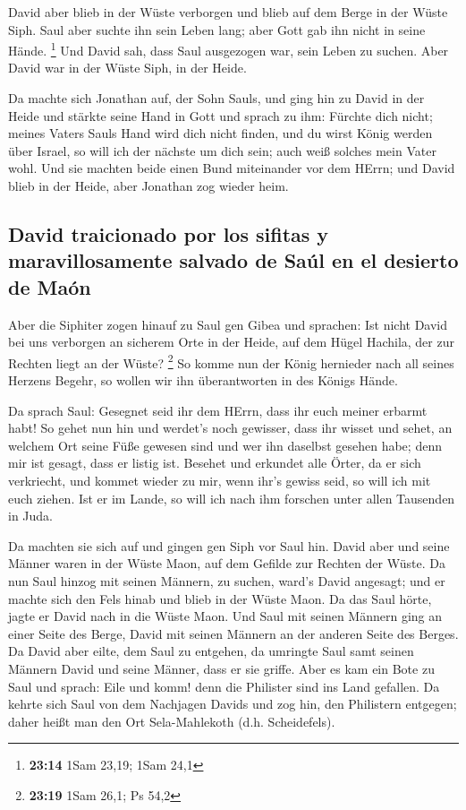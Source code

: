  David aber blieb in der Wüste verborgen und blieb auf
dem Berge in der Wüste Siph. Saul aber suchte ihn sein Leben lang; aber
Gott gab ihn nicht in seine Hände. \footnote{\textbf{23:14} 1Sam 23,19;
  1Sam 24,1}  Und David sah, dass Saul ausgezogen war,
sein Leben zu suchen. Aber David war in der Wüste Siph, in der Heide.

 Da machte sich Jonathan auf, der Sohn Sauls, und ging
hin zu David in der Heide und stärkte seine Hand in Gott 
und sprach zu ihm: Fürchte dich nicht; meines Vaters Sauls Hand wird
dich nicht finden, und du wirst König werden über Israel, so will ich
der nächste um dich sein; auch weiß solches mein Vater wohl.
 Und sie machten beide einen Bund miteinander vor dem
HErrn; und David blieb in der Heide, aber Jonathan zog wieder heim.

\hypertarget{david-traicionado-por-los-sifitas-y-maravillosamente-salvado-de-sauxfal-en-el-desierto-de-mauxf3n}{%
\subsection{David traicionado por los sifitas y maravillosamente salvado
de Saúl en el desierto de
Maón}\label{david-traicionado-por-los-sifitas-y-maravillosamente-salvado-de-sauxfal-en-el-desierto-de-mauxf3n}}

 Aber die Siphiter zogen hinauf zu Saul gen Gibea und
sprachen: Ist nicht David bei uns verborgen an sicherem Orte in der
Heide, auf dem Hügel Hachila, der zur Rechten liegt an der Wüste?
\footnote{\textbf{23:19} 1Sam 26,1; Ps 54,2}  So komme
nun der König hernieder nach all seines Herzens Begehr, so wollen wir
ihn überantworten in des Königs Hände.

 Da sprach Saul: Gesegnet seid ihr dem HErrn, dass ihr
euch meiner erbarmt habt!  So gehet nun hin und werdet's
noch gewisser, dass ihr wisset und sehet, an welchem Ort seine Füße
gewesen sind und wer ihn daselbst gesehen habe; denn mir ist gesagt,
dass er listig ist.  Besehet und erkundet alle Örter, da
er sich verkriecht, und kommet wieder zu mir, wenn ihr's gewiss seid, so
will ich mit euch ziehen. Ist er im Lande, so will ich nach ihm forschen
unter allen Tausenden in Juda.

 Da machten sie sich auf und gingen gen Siph vor Saul
hin. David aber und seine Männer waren in der Wüste Maon, auf dem
Gefilde zur Rechten der Wüste.  Da nun Saul hinzog mit
seinen Männern, zu suchen, ward's David angesagt; und er machte sich den
Fels hinab und blieb in der Wüste Maon. Da das Saul hörte, jagte er
David nach in die Wüste Maon.  Und Saul mit seinen
Männern ging an einer Seite des Berge, David mit seinen Männern an der
anderen Seite des Berges. Da David aber eilte, dem Saul zu entgehen, da
umringte Saul samt seinen Männern David und seine Männer, dass er sie
griffe.  Aber es kam ein Bote zu Saul und sprach: Eile
und komm! denn die Philister sind ins Land gefallen.  Da
kehrte sich Saul von dem Nachjagen Davids und zog hin, den Philistern
entgegen; daher heißt man den Ort Sela-Mahlekoth (d.h. Scheidefels).

